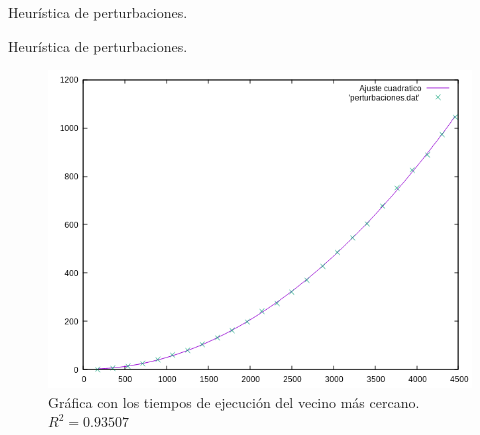 \documentclass[10pt, xcolor=table]{beamer}
\begin{document}
\begin{frame}[fragile]{Heurística de perturbaciones. }
\begin{table}[h!]
 	\centering
 	\footnotesize
 	\caption{Experiencia empírica de perturbaciones}
 \end{table}
\end{frame}

\begin{frame}[fragile]{Heurística de perturbaciones. }
\begin{figure}[h!]
 	\centering
 	\includegraphics[scale=0.5]{./Images/perturbaciones.png}
 	\caption{Gráfica con los tiempos de ejecución del vecino más cercano. \(R^2 = 0.93507\)}
 \end{figure}
\end{frame}
\end{document}
